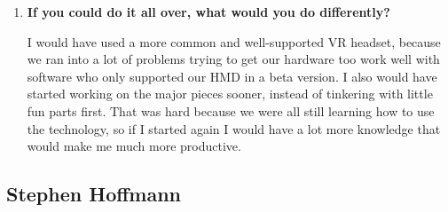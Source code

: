 \documentclass[onecolumn, draftclsnofoot,10pt, compsoc]{IEEEtran}
\begin{document}
\begin{enumerate}
    \item \textbf{If you could do it all over, what would you do differently?}
    
    I would have used a more common and well-supported VR headset, because we ran into a lot of problems trying to get our hardware too work well with software who only supported our HMD in a beta version. I also would have started working on the major pieces sooner, instead of tinkering with little fun parts first. That was hard because we were all still learning how to use the technology, so if I started again I would have a lot more knowledge that would make me much more productive.
    
\end{enumerate}
\subsection{Stephen Hoffmann}
\end{document}
